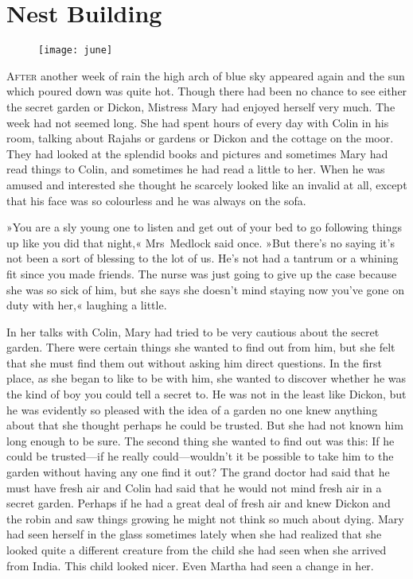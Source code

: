 \chapter{Nest Building} 
	
\begin{figure}[t!]
\centering
\texttt{[image: june]}
\end{figure}

	\lettrine[lines=6]{A}{fter} another week of rain the high arch of blue sky appeared again and the sun which poured down was quite hot. Though there had been no chance to see either the secret garden or Dickon, Mistress Mary had enjoyed herself very much. The week had not seemed long. She had spent hours of every day with Colin in his room, talking about Rajahs or gardens or Dickon and the cottage on the moor. They had looked at the splendid books and pictures and sometimes Mary had read things to Colin, and sometimes he had read a little to her. When he was amused and interested she thought he scarcely looked like an invalid at all, except that his face was so colourless and he was always on the sofa.

»You are a sly young one to listen and get out of your bed to go following things up like you did that night,« Mrs~Medlock said once. »But there's no saying it's not been a sort of blessing to the lot of us. He's not had a tantrum or a whining fit since you made friends. The nurse was just going to give up the case because she was so sick of him, but she says she doesn't mind staying now you've gone on duty with her,« laughing a little.

In her talks with Colin, Mary had tried to be very cautious about the secret garden. There were certain things she wanted to find out from him, but she felt that she must find them out without asking him direct questions. In the first place, as she began to like to be with him, she wanted to discover whether he was the kind of boy you could tell a secret to. He was not in the least like Dickon, but he was evidently so pleased with the idea of a garden no one knew anything about that she thought perhaps he could be trusted. But she had not known him long enough to be sure. The second thing she wanted to find out was this: If he could be trusted—if he really could—wouldn't it be possible to take him to the garden without having any one find it out? The grand doctor had said that he must have fresh air and Colin had said that he would not mind fresh air in a secret garden. Perhaps if he had a great deal of fresh air and knew Dickon and the robin and saw things growing he might not think so much about dying. Mary had seen herself in the glass sometimes lately when she had realized that she looked quite a different creature from the child she had seen when she arrived from India. This child looked nicer. Even Martha had seen a change in her.

